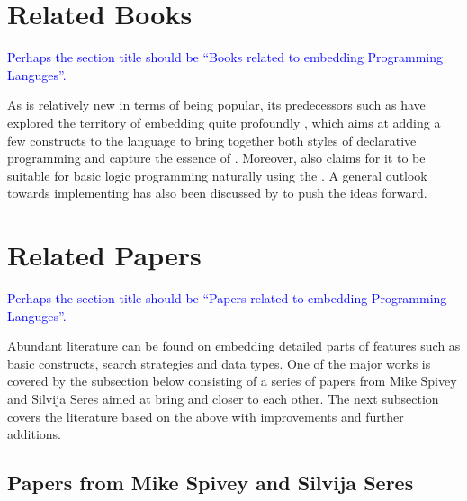 \documentclass[thesis-solanki.tex]{subfiles}
\begin{document}
\section{Related Books}
\textcolor{blue}{Perhaps the section title should be ``Books related to embedding Programming Languges''.}

As  is relatively new in terms of being popular, its predecessors such as  have
explored the territory of embedding  quite profoundly \cite{friedman05reasoned}, which aims at adding a few
constructs to the language to bring together both styles of declarative programming and capture the essence of
.
Moreover,  also claims for it to be suitable for basic logic programming naturally using the
 \cite{website:logicprogexamplehaskell}.
A general outlook towards implementing  has also been discussed by
\cite{krishnamurthi2007programming} to push the ideas forward.

\section{Related Papers}
\textcolor{blue}{Perhaps the section title should be ``Papers related to embedding Programming Languges''.}

Abundant literature can be found on embedding detailed parts of  features such as basic
constructs, search strategies and data types.
One of the major works is covered by the subsection below consisting of a series of papers from Mike Spivey and
Silvija Seres aimed at bring  and  closer to each other.
The next subsection covers the literature based on the above
with improvements and further additions.


\subsection{Papers from Mike Spivey and Silvija Seres}
\end{document}
